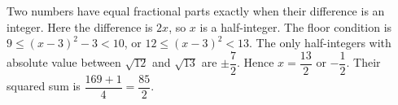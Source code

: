 Two numbers have equal fractional parts exactly when their difference is an integer. Here the difference is $2x$, so $x$ is a half-integer. The floor condition is $9\le(x-3)^2-3<10$, or $12\le(x-3)^2<13$. The only half-integers with absolute value between $\sqrt{12}$ and $\sqrt{13}$ are $\pm\dfrac{7}{2}$. Hence $x=\dfrac{13}{2}$ or $-\dfrac{1}{2}$. Their squared sum is $\dfrac{169+1}{4}=\boxed{\dfrac{85}{2}}$.
